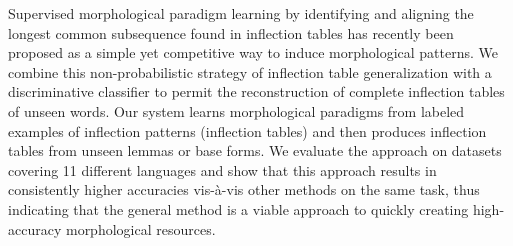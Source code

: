 Supervised morphological paradigm learning by identifying and aligning the longest common subsequence found in inflection tables has recently been proposed as a simple yet competitive way to induce morphological patterns.  We combine this non-probabilistic strategy of inflection table generalization with a discriminative classifier to permit the reconstruction of complete inflection tables of unseen words.  Our system learns morphological paradigms from labeled examples of inflection patterns (inflection tables) and then produces inflection tables from unseen lemmas or base forms.  We evaluate the approach on datasets covering 11 different languages and show that this approach results in consistently higher accuracies vis-à-vis other methods on the same task, thus indicating that the general method is a viable approach to quickly creating high-accuracy morphological resources.
